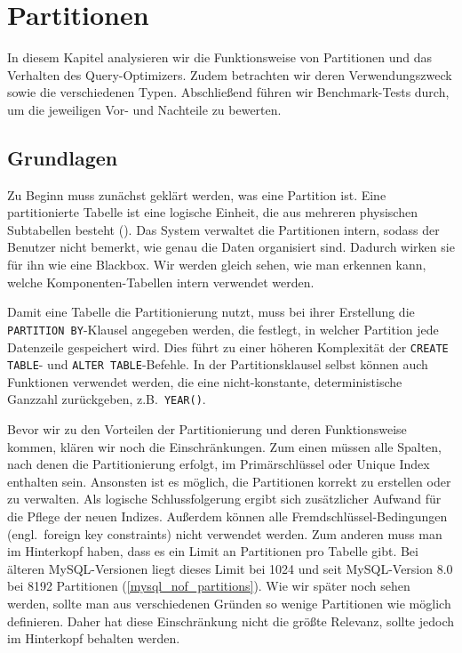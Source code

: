 
\chapter{Partitionen}\label{ch:partitions}
In diesem Kapitel analysieren wir die Funktionsweise von Partitionen und das Verhalten des Query-Optimizers.
Zudem betrachten wir deren Verwendungszweck sowie die verschiedenen Typen.
Abschließend führen wir Benchmark-Tests durch, um die jeweiligen Vor- und Nachteile zu bewerten.

\section{Grundlagen}\label{sec:partition-grundlagen}
Zu Beginn muss zunächst geklärt werden, was eine Partition ist.
Eine partitionierte Tabelle ist eine logische Einheit, die aus mehreren physischen Subtabellen besteht (\cite[pp. 265--273]{schwartz2012high}).
Das System verwaltet die Partitionen intern, sodass der Benutzer nicht bemerkt, wie genau die Daten organisiert sind.
Dadurch wirken sie für ihn wie eine Blackbox.
Wir werden gleich sehen, wie man erkennen kann, welche Komponenten-Tabellen intern verwendet werden.

Damit eine Tabelle die Partitionierung nutzt, muss bei ihrer Erstellung die \texttt{PARTITION BY}-Klausel angegeben werden, die festlegt, in welcher Partition jede Datenzeile gespeichert wird.
Dies führt zu einer höheren Komplexität der \texttt{CREATE TABLE}- und \texttt{ALTER TABLE}-Befehle.
In der Partitionsklausel selbst können auch Funktionen verwendet werden, die eine nicht-konstante, deterministische Ganzzahl zurückgeben, z.B.\ \texttt{YEAR()}.

Bevor wir zu den Vorteilen der Partitionierung und deren Funktionsweise kommen, klären wir noch die Einschränkungen.
Zum einen müssen alle Spalten, nach denen die Partitionierung erfolgt, im Primärschlüssel oder Unique Index enthalten sein.
Ansonsten ist es möglich, die Partitionen korrekt zu erstellen oder zu verwalten.
Als logische Schlussfolgerung ergibt sich zusätzlicher Aufwand für die Pflege der neuen Indizes.
Außerdem können alle Fremdschlüssel-Bedingungen (engl.\ foreign key constraints) nicht verwendet werden.
Zum anderen muss man im Hinterkopf haben, dass es ein Limit an Partitionen pro Tabelle gibt.
Bei älteren MySQL-Versionen liegt dieses Limit bei 1024 und seit MySQL-Version 8.0 bei 8192 Partitionen (\ref{mysql_nof_partitions}).
Wie wir später noch sehen werden, sollte man aus verschiedenen Gründen so wenige Partitionen wie möglich definieren.
Daher hat diese Einschränkung nicht die größte Relevanz, sollte jedoch im Hinterkopf behalten werden.

